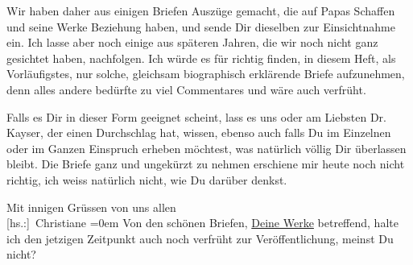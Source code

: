 \pstart
           Wir haben daher aus einigen Briefen Auszüge gemacht, die auf Papas Schaffen und seine Werke Beziehung
               haben, und sende Dir dieselben zur Einsichtnahme ein. Ich lasse aber noch einige aus
               späteren Jahren, die wir noch nicht ganz gesichtet haben, nachfolgen. Ich würde es
               für richtig finden, in diesem Heft, als Vorläufigstes, nur solche, gleichsam
               biographisch erklärende Briefe aufzunehmen, denn alles andere bedürfte zu viel
               Commentares und wäre auch verfrüht.\pend
           
\pstart
           Falls es Dir in dieser Form geeignet scheint, lass es uns oder am Liebsten Dr. Kayser, der einen Durchschlag hat, wissen,
               ebenso auch falls Du im Einzelnen oder im Ganzen Einspruch erheben möchtest, was
               natürlich völlig Dir überlassen bleibt. Die Briefe ganz und ungekürzt zu nehmen
               erschiene mir heute noch nicht richtig, ich weiss natürlich nicht, wie Du darüber
               denkst.\pend
           
\pstart
           Mit innigen Grüssen von uns allen{\\[\baselineskip]}\spacefill\mbox{{[}hs.:{]} Christiane}\pend
           \leftskip=0em{}
\pstart
           \noindent{}{\pb}Von den schönen Briefen, \uline{Deine Werke} betreffend, halte ich den jetzigen
                  Zeitpunkt auch noch verfrüht zur Veröffentlichung, meinst Du nicht?\pend
           \endnumbering{}  
      
